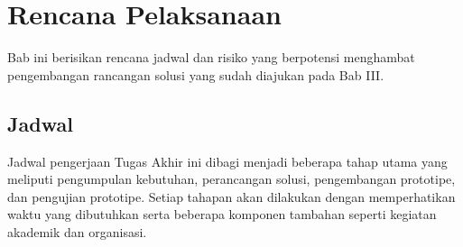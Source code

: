 \chapter{Rencana Pelaksanaan}

Bab ini berisikan rencana jadwal dan risiko yang berpotensi menghambat pengembangan rancangan solusi yang sudah diajukan pada Bab III.  






\section{Jadwal}
\label{sec:jadwal}


Jadwal pengerjaan Tugas Akhir ini dibagi menjadi beberapa tahap utama yang meliputi pengumpulan kebutuhan, perancangan solusi, pengembangan prototipe, dan pengujian prototipe. Setiap tahapan akan dilakukan dengan memperhatikan waktu yang dibutuhkan serta beberapa komponen tambahan seperti kegiatan akademik dan organisasi.

